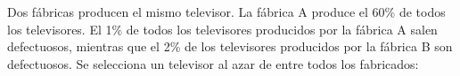\documentclass[addpoints,spanish, 12pt,a4paper]{exam}
\begin{document}
\begin{questions}
        

        
        
        \question Dos fábricas producen el mismo televisor. La fábrica A produce el 60\% de todos los televisores.
El 1\% de todos los televisores producidos por la fábrica A salen defectuosos, mientras que el 2\% de los
televisores producidos por la fábrica B son defectuosos. Se selecciona un televisor al azar de entre
todos los fabricados:




\end{questions}
\end{document}
